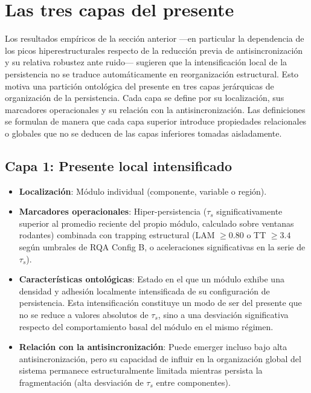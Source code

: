 \section{Las tres capas del presente}

Los resultados empíricos de la sección anterior —en particular la dependencia de los picos hiperestructurales respecto de la reducción previa de antisincronización y su relativa robustez ante ruido— sugieren que la intensificación local de la persistencia no se traduce automáticamente en reorganización estructural. Esto motiva una partición ontológica del presente en tres capas jerárquicas de organización de la persistencia. Cada capa se define por su localización, sus marcadores operacionales y su relación con la antisincronización. Las definiciones se formulan de manera que cada capa superior introduce propiedades relacionales o globales que no se deducen de las capas inferiores tomadas aisladamente.

\subsection{Capa 1: Presente local intensificado}

\begin{itemize}
    \item \textbf{Localización}: Módulo individual (componente, variable o región).
    \item \textbf{Marcadores operacionales}: Hiper-persistencia ($\tau_s$ significativamente superior al promedio reciente del propio módulo, calculado sobre ventanas rodantes) combinada con trapping estructural (LAM $\geq 0.80$ o TT $\geq 3.4$ según umbrales de RQA Config B, o aceleraciones significativas en la serie de $\tau_s$).
    \item \textbf{Características ontológicas}: Estado en el que un módulo exhibe una densidad y adhesión localmente intensificada de su configuración de persistencia. Esta intensificación constituye un modo de ser del presente que no se reduce a valores absolutos de $\tau_s$, sino a una desviación significativa respecto del comportamiento basal del módulo en el mismo régimen.
    \item \textbf{Relación con la antisincronización}: Puede emerger incluso bajo alta antisincronización, pero su capacidad de influir en la organización global del sistema permanece estructuralmente limitada mientras persista la fragmentación (alta desviación de $\tau_s$ entre componentes).
\end{itemize}

